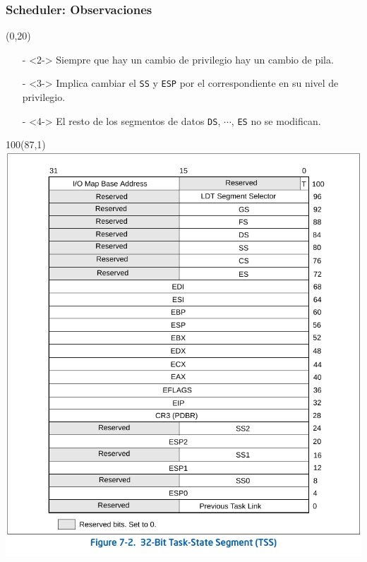 \documentclass[aspectratio=169]{beamer}
\begin{document}
\begin{frame}
    \frametitle{Scheduler: Observaciones}
    \begin{textblock}{80}(0,20)
    \begin{itemize}
    \setlength\itemsep{0.5cm}
    \item[-]<2-> Siempre que hay un cambio de privilegio hay un cambio de pila.
    \item[-]<3-> Implica cambiar el \texttt{SS} y \texttt{ESP} por el correspondiente en su nivel de privilegio.
    \item[-]<4-> El resto de los segmentos de datos \texttt{DS}, $\cdots$, \texttt{ES} no se modifican.
    \end{itemize}
     \end{textblock}
    \begin{textblock}{100}(87,1) \includegraphics[scale=0.58]{img/TSS.pdf} \end{textblock}
\end{frame}
\end{document}
